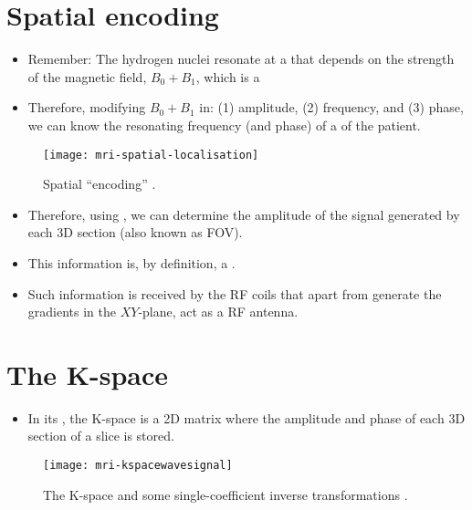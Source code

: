 \section{Spatial encoding}
\label{sec:spatial_encoding}
\begin{itemize}
\item Remember: The hydrogen nuclei resonate at a
   that depends on the strength of
  the magnetic field, $B_0+B_1$, which is a 
\item Therefore, modifying $B_0+B_1$ in: (1) amplitude, (2)
  frequency, and (3) phase, we can know the resonating frequency (and
  phase) of a  of the patient.
\end{itemize}
\vspace{-4ex}
\begin{figure}[!b]
  \centering
  \texttt{[image: mri-spatial-localisation]}
  \caption{Spatial ``encoding'' \cite{abdulla2025MRI_encoding}.}
  \label{fig:MRI-encoding}
\end{figure}

\begin{itemize}
\item Therefore, using , we can determine the amplitude of the
  signal generated by each 3D section (also known as \gls{FOV}).
\item This information is, by definition, a .
\item Such information is received by the RF coils that apart from
  generate the gradients in the $XY$-plane, act as a RF antenna.
\end{itemize}

\section{The K-space}
\begin{itemize}
\item In its , the K-space is a 2D matrix where the
  amplitude and phase of each 3D section of a slice is stored.
\end{itemize}
\vspace{-4ex}
\begin{figure}[!b]
  \centering
  \texttt{[image: mri-kspacewavesignal]}
  \caption{The K-space and some single-coefficient inverse transformations \cite{abdulla2025MRI_Kspace}.}
  \label{fig:MRI-Kspace}
\end{figure}

